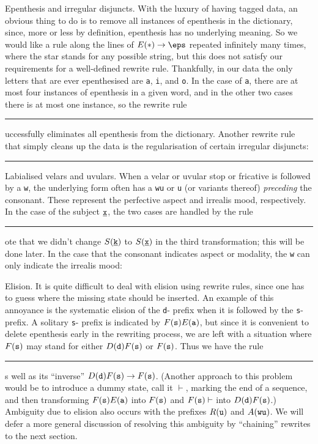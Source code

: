 \medskip\boldlabel Epenthesis and irregular disjuncts.
With the luxury of having tagged data,
an obvious thing to do is to remove all instances of epenthesis in the dictionary, since, more or less by definition,
epenthesis
has no underlying meaning. So we would like a rule along the lines of
$\E{*}\to \eps$ repeated infinitely many times, where the star stands for any possible string, but this does
not satisfy our requirements for a well-defined rewrite rule. Thankfully, in our data
the only letters that are ever epenthesised are {\tt a}, {\tt i}, and {\tt o}. In the case of {\tt a},
there are at most four instances of epenthesis in a given word, and in the other two cases there is at most
one instance, so the rewrite rule
\resetnum\parindent=34pt
\rule{$\E{a}\to \eps, \E{a}\to \eps,\E{a}\to \eps,\E{a}\to \eps, \E{i}\to \eps, \E{o}\to \eps$}
successfully eliminates all epenthesis from the dictionary. Another rewrite rule that simply cleans up the data
is the regularisation of certain irregular disjuncts:
\rule{$\Q{e}\to \Q{a},\Q{k}\to \Q{ka},\Q{\x'}\to \Q{\x'e},\Q{j}\to \Q{ji},\Q{t}\to \Q{tu}$}

\medskip\boldlabel Labialised velars and uvulars.
When a velar or uvular stop or fricative is followed by a {\tt w}, the underlying form often has a {\tt wu}
or {\tt u} (or variants thereof) {\it preceding} the consonant. These represent the perfective aspect and
irrealis mood, respectively. In the case of the subject ${\tt \underline{x}}$, the two cases are handled by the rule
\rule{$\S{\x}\A{w}\to \A{wu}\S{\x}, \S{\x}\R{w}\to \R{u}\S{\x}, \S{\k}\R{w}\to \R{u}\S{\k}$.}
Note that we didn't change $S({\tt \underline{k}})$ to $S({\tt \underline{x}})$ in the third transformation; this will be done later.
In the case that the consonant indicates aspect or modality, the {\tt w} can only indicate the irrealis mood:

\medskip\boldlabel Elision. It is quite difficult to deal with elision using rewrite rules, since one has to
guess where the missing state should be inserted. An example of this annoyance is the systematic
elision of the {\tt d}- prefix when it is followed by the {\tt s}- prefix. A solitary {\tt s}- prefix is indicated
by $F({\tt s})E({\tt a})$, but since it is convenient to delete epenthesis early in the rewriting process, we are left
with a situation where $F({\tt s})$ may stand for either $D({\tt d})F({\tt s})$ or $F({\tt s})$. Thus we have the rule
\rule{$\F{s}\to \D{d}\F{s}$,}
as well as its ``inverse'' $D({\tt d})F({\tt s})\to F({\tt s})$. (Another approach to this problem would be to introduce a dummy
state, call it $\vdash$, marking the end of a sequence, and then transforming $F({\tt s})E({\tt a})$ into $F({\tt s})$ and
$F({\tt s})\vdash$ into $D({\tt d})F({\tt s})$.) Ambiguity due to elision
also occurs with the prefixes $R({\tt u})$ and $A({\tt wu})$.
We will defer a more general discussion of resolving this ambiguity by ``chaining'' rewrites to the next section.

